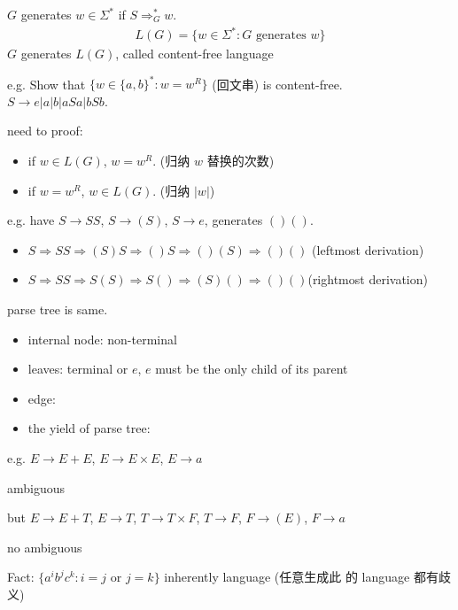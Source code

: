 \begin{definition}
    $G$ generates $w\in \Sigma^*$ if $S\Rightarrow_G^* w$. 
    \begin{align*}
        L(G)=\{ w\in \Sigma^*: G\text{ generates }w \}
    \end{align*}
    $G$ generates $L(G)$, called content-free language
\end{definition}

e.g. Show that $\{ w\in \{ a,b \}^*: w=w^R \}$ (回文串) is content-free.\\
$S\to e|a|b|aSa|bSb$. 

need to proof:
\begin{itemize}
    \item if $w\in L(G)$, $w=w^R$. (归纳 $w$ 替换的次数)
    \item if $w=w^R$, $w\in L(G)$. (归纳 $|w|$)
\end{itemize}

e.g. have $S\to SS$, $S\to (S)$, $S\to e$, generates $()()$. 
\begin{itemize}
    \item $S\Rightarrow SS\Rightarrow (S)S\Rightarrow ()S\Rightarrow()(S)\Rightarrow()()$ (leftmost derivation)
    \item $S\Rightarrow SS\Rightarrow S(S)\Rightarrow S()\Rightarrow (S)()\Rightarrow ()()$(rightmost derivation)
\end{itemize}
parse tree is same. 

\begin{definition}%
    \quad

    \begin{itemize}
        \item internal node: non-terminal
        \item leaves: terminal or $e$, $e$ must be the only child of its parent
        \item edge: 
        \item the yield of parse tree: 
    \end{itemize}
\end{definition}

e.g. $E\to E+E$, $E\to E\times E$, $E\to a$%

ambiguous

but $E\to E+T$, $E\to T$, $T\to T \times F$, $T\to F$, $F\to (E)$, $F\to a$

no ambiguous

Fact: $\{ a^ib^jc^k:i=j \text{ or }j=k \}$ inherently language (任意生成此 的 language 都有歧义) 

